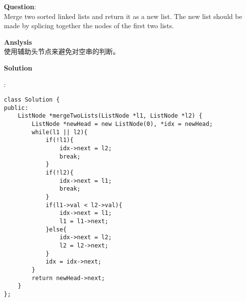     
\begin{description}
    \item{\textbf{Question}}:\\%
		Merge two sorted linked lists and return it as a new list. The new list should be made by splicing together the nodes of the first two lists.\\

    \item{\textbf{Anslysis}}\\
		使用辅助头节点来避免对空串的判断。\\

    \item{\textbf{Solution}}
	\item{} : \\
		\begin{lstlisting}
class Solution {
public:
    ListNode *mergeTwoLists(ListNode *l1, ListNode *l2) {
    	ListNode *newHead = new ListNode(0), *idx = newHead;
    	while(l1 || l2){
    		if(!l1){
    			idx->next = l2;
    			break;
    		}
    		if(!l2){
    			idx->next = l1;
    			break;
    		}
    		if(l1->val < l2->val){
    			idx->next = l1;
    			l1 = l1->next;
    		}else{
    			idx->next = l2;
    			l2 = l2->next;
    		}
    		idx = idx->next;
    	}
    	return newHead->next;
    }
};
		\end{lstlisting}

\end{description}

